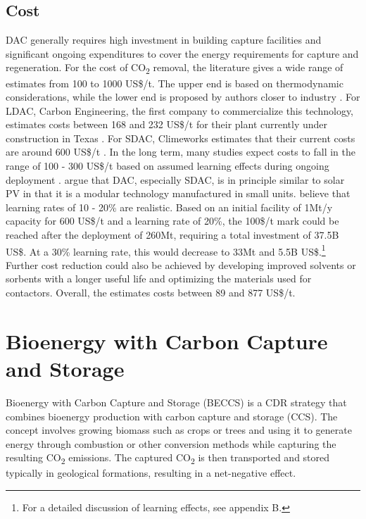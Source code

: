 \subsection*{Cost}
DAC generally requires high investment in building capture facilities and significant ongoing expenditures to cover the energy requirements for capture and regeneration.
For the cost of CO\textsubscript{2} removal, the literature gives a wide range of estimates from 100 to 1000 US\$/t. The upper end is based on thermodynamic considerations, while the lower end is proposed by authors closer to industry \parencite{Ishimoto2017PUTTINGCONTEXT, NRC2015ClimateSequestration}.
For LDAC, Carbon Engineering, the first company to commercialize this technology, estimates costs between 168 and 232 US\$/t for their plant currently under construction in Texas \parencite{McQueen2021AFuture}. For SDAC, Climeworks estimates that their current costs are around 600 US\$/t \parencite[220]{NAS2018NegativeAgenda}.
In the long term, many studies expect costs to fall in the range of 100 - 300 US\$/t based on assumed learning effects during ongoing deployment \parencite{Mulligan2020CarbonShot:States, McQueen2021AFuture, NAS2018NegativeAgenda}. \textcite{Lackner2021BuyingCapture} argue that DAC, especially SDAC, is in principle similar to solar PV in that it is a modular technology manufactured in small units. \textcite{McQueen2021AFuture} believe that learning rates of 10 - 20\% are realistic. Based on an initial facility of 1Mt/y capacity for 600 US\$/t and a learning rate of 20\%, the 100\$/t mark could be reached after the deployment of 260Mt, requiring a total investment of 37.5B US\$. At a 30\% learning rate, this would decrease to 33Mt and 5.5B US\$.\footnote{For a detailed discussion of learning effects, see appendix B.}
Further cost reduction could also be achieved by developing improved solvents or sorbents with a longer useful life and optimizing the materials used for contactors.
Overall, the \textcite{NAS2018NegativeAgenda} estimates costs between 89 and 877 US\$/t.

\section{Bioenergy with Carbon Capture and Storage}
Bioenergy with Carbon Capture and Storage (BECCS) is a CDR strategy that combines bioenergy production with carbon capture and storage (CCS). The concept involves growing biomass such as crops or trees and using it to generate energy through combustion or other conversion methods while capturing the resulting CO\textsubscript{2} emissions. The captured CO\textsubscript{2} is then transported and stored typically in geological formations, resulting in a net-negative effect.
